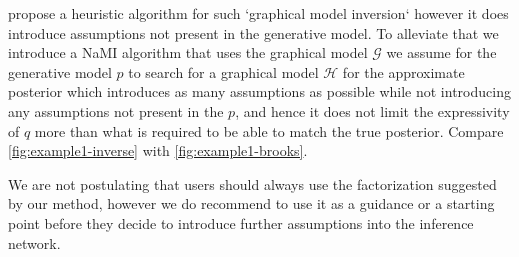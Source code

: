 \documentclass[12pt]{article}
\begin{document}
\citet{StuhlmullerEtAl2013} propose a heuristic algorithm for such `graphical model inversion` however it does introduce assumptions not present in the generative model.
To alleviate that we introduce a NaMI algorithm that uses the graphical model $\mathcal{G}$ we assume for the generative model $p$ to search for a graphical model $\mathcal{H}$ for the approximate posterior which introduces as many assumptions as possible while not introducing any assumptions not present in the $p$, and hence it does not limit the expressivity of $q$ more than what is required to be able to match the true posterior. 
Compare \autoref{fig:example1-inverse} with \autoref{fig:example1-brooks}.

We are not postulating that users should always use the factorization suggested by our method,
however we do recommend to use it as a guidance or a starting point before they decide to
introduce further assumptions into the inference network.


\end{document}
